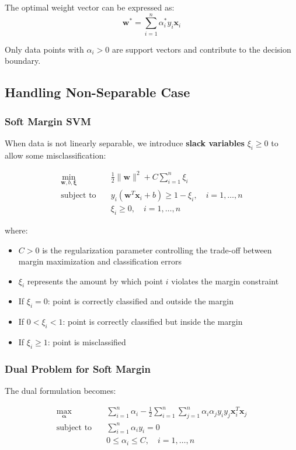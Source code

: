 \documentclass[12pt,a4paper]{article}
\begin{document}
The optimal weight vector can be expressed as:
\begin{equation}
\mathbf{w}^* = \sum_{i=1}^n \alpha_i^* y_i \mathbf{x}_i
\end{equation}

Only data points with $\alpha_i > 0$ are support vectors and contribute to the decision boundary.

\subsection{Handling Non-Separable Case}

\subsubsection{Soft Margin SVM}
When data is not linearly separable, we introduce \textbf{slack variables} $\xi_i \geq 0$ to allow some misclassification:

\begin{align}
\min_{\mathbf{w}, b, \boldsymbol{\xi}} \quad &\frac{1}{2}\|\mathbf{w}\|^2 + C\sum_{i=1}^n \xi_i \\
\text{subject to} \quad &y_i(\mathbf{w}^T\mathbf{x}_i + b) \geq 1 - \xi_i, \quad i = 1, \ldots, n \\
&\xi_i \geq 0, \quad i = 1, \ldots, n
\end{align}

where:
\begin{itemize}
    \item $C > 0$ is the regularization parameter controlling the trade-off between margin maximization and classification errors
    \item $\xi_i$ represents the amount by which point $i$ violates the margin constraint
    \item If $\xi_i = 0$: point is correctly classified and outside the margin
    \item If $0 < \xi_i < 1$: point is correctly classified but inside the margin
    \item If $\xi_i \geq 1$: point is misclassified
\end{itemize}

\subsubsection{Dual Problem for Soft Margin}
The dual formulation becomes:

\begin{align}
\max_{\boldsymbol{\alpha}} \quad &\sum_{i=1}^n \alpha_i - \frac{1}{2}\sum_{i=1}^n\sum_{j=1}^n \alpha_i \alpha_j y_i y_j \mathbf{x}_i^T\mathbf{x}_j \\
\text{subject to} \quad &\sum_{i=1}^n \alpha_i y_i = 0 \\
&0 \leq \alpha_i \leq C, \quad i = 1, \ldots, n
\end{align}
\end{document}
